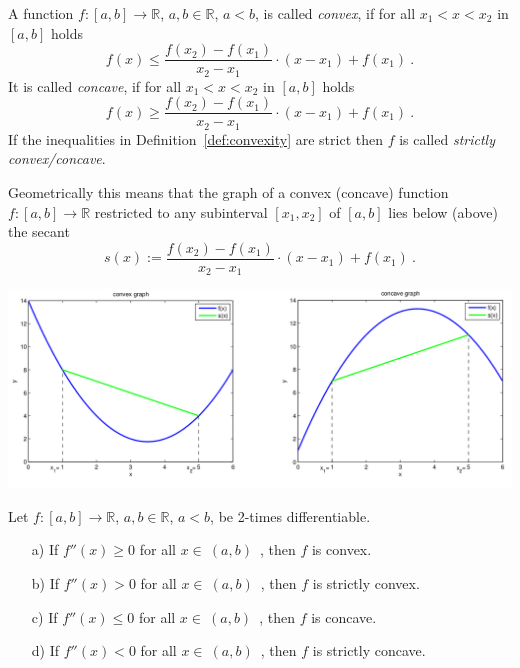 \begin{Definition} \label{def:convexity}
    A function $f:[a,b]\rightarrow \mathbb{R}$, $a,b\in\mathbb{R}$, $a<b$, is called \emph{convex}, if for all $x_1<x<x_2$ in $[a,b]$ holds
    \begin{equation}\label{eq:convex} 
      f(x) \leq \frac{f(x_2)-f(x_1)}{x_2-x_1}\cdot(x-x_1)+f(x_1)\ .      
    \end{equation}
    It is called \emph{concave}, if for all $x_1<x<x_2$ in $[a,b]$ holds
    \begin{equation}\label{eq:concave} 
      f(x)\geq \frac{f(x_2)-f(x_1)}{x_2-x_1}\cdot(x-x_1)+f(x_1)\ .
    \end{equation}
    If the inequalities in Definition~\ref{def:convexity} are strict then $f$ is called \emph{strictly convex/concave}.
    
Geometrically this means that the graph of a convex (concave) function $f:[a,b]\rightarrow \mathbb{R}$ restricted to any subinterval 
$[x_1,x_2]$ of $[a,b]$ lies 
below (above) the secant $$s(x):=\frac{f(x_2)-f(x_1)}{x_2-x_1}\cdot(x-x_1)+f(x_1) \ .$$
\end{Definition}

\includegraphics{./conc.png}

\begin{Theorem}{} \label{th:convconc}
    Let $f:[a,b]\rightarrow \mathbb{R}$, $a,b\in\mathbb{R}$, $a<b$, be 2-times differentiable. 
  \begin{enumerate}
   \item[a)]   If $f''(x)\geq 0$ for all $x\in~(a,b)$~, then $f$ is convex.
   \item[b)]   If $f''(x)>0$ for all $x\in~(a,b)$~, then $f$ is strictly convex.
   \item[c)]   If $f''(x)\leq 0$ for all $x\in~(a,b)$~, then $f$ is concave.
   \item[d)]   If $f''(x)<0$ for all $x\in~(a,b)$~, then $f$ is strictly concave.
  \end{enumerate}
\end{Theorem}

